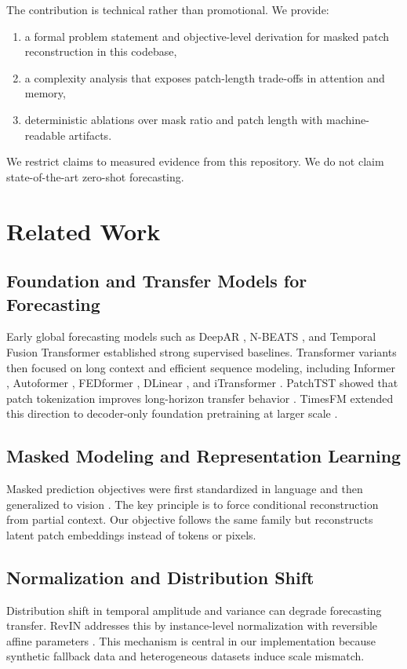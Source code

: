 \documentclass[conference]{IEEEtran}
\begin{document}
The contribution is technical rather than promotional. We provide:
\begin{enumerate}
    \item a formal problem statement and objective-level derivation for masked patch reconstruction in this codebase,
    \item a complexity analysis that exposes patch-length trade-offs in attention and memory,
    \item deterministic ablations over mask ratio and patch length with machine-readable artifacts.
\end{enumerate}

We restrict claims to measured evidence from this repository. We do not claim state-of-the-art zero-shot forecasting.

\section{Related Work}
\subsection{Foundation and Transfer Models for Forecasting}
Early global forecasting models such as DeepAR \cite{salinas2020deepar}, N-BEATS \cite{oreshkin2020nbeats}, and Temporal Fusion Transformer \cite{lim2021tft} established strong supervised baselines. Transformer variants then focused on long context and efficient sequence modeling, including Informer \cite{informer}, Autoformer \cite{autoformer}, FEDformer \cite{fedformer}, DLinear \cite{dlinear}, and iTransformer \cite{itransformer}. PatchTST showed that patch tokenization improves long-horizon transfer behavior \cite{patchtst}. TimesFM extended this direction to decoder-only foundation pretraining at larger scale \cite{timesfm}.

\subsection{Masked Modeling and Representation Learning}
Masked prediction objectives were first standardized in language and then generalized to vision \cite{devlin2019bert,he2022mae}. The key principle is to force conditional reconstruction from partial context. Our objective follows the same family but reconstructs latent patch embeddings instead of tokens or pixels.

\subsection{Normalization and Distribution Shift}
Distribution shift in temporal amplitude and variance can degrade forecasting transfer. RevIN addresses this by instance-level normalization with reversible affine parameters \cite{revin}. This mechanism is central in our implementation because synthetic fallback data and heterogeneous datasets induce scale mismatch.
\end{document}
